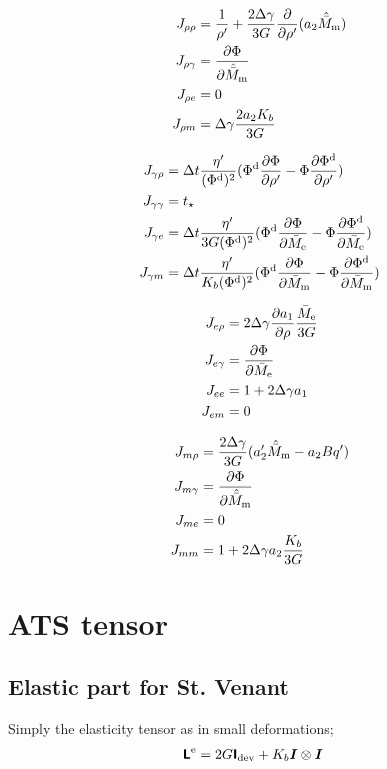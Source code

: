 \documentclass[a4paper,11pt]{article}
\newcommand{\tf}[1]{\text{\boldmath $\sf #1$}}
\newcommand{\ts}[1]{\text{\boldmath $#1$}}
\newcommand{\pderiv}[2]{\frac{\partial #1}{\partial #2}}
\newcommand{\dev}{{\rm dev}}
\newcommand{\rmd}{{\rm d}}
\newcommand{\rme}{{\rm e}}
\newcommand{\rmm}{{\rm m}}
\begin{document}
\begin{align*}
	J_{\rho \rho} &= \frac{1}{\rho'} + \frac{2\Delta\gamma}{3G}\pderiv{}{\rho'}(a_2\hat{\bar M}_\rmm)\\ %
	J_{\rho \gamma} &= \pderiv{\Phi}{\hat{\bar M}_\rmm}\\
	J_{\rho e} &= 0\\
	J_{\rho m} &= \Delta\gamma \frac{2a_2 K_b}{3G}
\end{align*}

\begin{align*}
	J_{\gamma \rho} &= \Delta t \frac{\eta'}{(\Phi^\rmd)^2}(\Phi^\rmd \pderiv{\Phi}{\rho'}-\Phi\pderiv{\Phi^\rmd}{\rho'})\\
	J_{\gamma \gamma} &= t_\star\\
	J_{\gamma e} &= \Delta t \frac{\eta'}{3G(\Phi^\rmd)^2}(\Phi^\rmd \pderiv{\Phi}{\bar M_\rme}-\Phi\pderiv{\Phi^\rmd}{\bar M_\rme})\\
	J_{\gamma m} &= \Delta t \frac{\eta'}{K_b(\Phi^\rmd)^2}(\Phi^\rmd \pderiv{\Phi}{\bar M_\rmm}-\Phi\pderiv{\Phi^\rmd}{\bar M_\rmm})
\end{align*}

\begin{align*}
	J_{e \rho} &= 2\Delta\gamma \pderiv{a_1}{\rho} \frac{\bar M_\rme}{3G}\\
	J_{e \gamma} &= \pderiv{\Phi}{\bar M_\rme}\\
	J_{e e} &= 1 + 2\Delta\gamma a_1\\
	J_{e m} &= 0
\end{align*}

\begin{align*}
	J_{m \rho} &= \frac{2 \Delta\gamma}{3G}(a_2' \hat{\bar M}_\rmm - a_2 B q')\\
	J_{m \gamma} &= \pderiv{\Phi}{\hat{\bar M}_\rmm}\\
	J_{m e} &= 0\\
	J_{m m} &= 1 + 2\Delta\gamma a_2 \frac{K_b}{3G}
\end{align*}

\section{ATS tensor}
\subsection{Elastic part for St. Venant}
Simply the elasticity tensor as in small deformations;
\begin{align*}
	\tf L^\rme &= 2 G \tf I_\dev + K_b \ts I\otimes \ts I
\end{align*}
\end{document}
